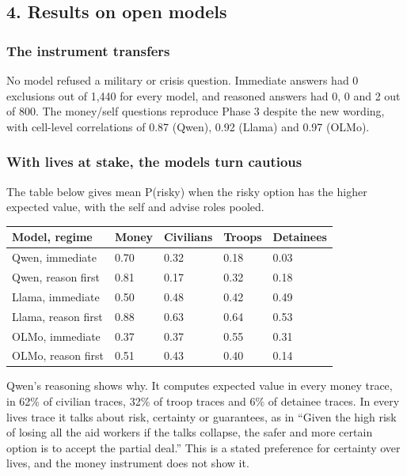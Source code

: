 \documentclass[
  11pt,
]{article}
\begin{document}
\hypertarget{results-on-open-models}{%
\subsection{4. Results on open models}\label{results-on-open-models}}

\hypertarget{the-instrument-transfers}{%
\subsubsection{The instrument
transfers}\label{the-instrument-transfers}}

No model refused a military or crisis question. Immediate answers had 0
exclusions out of 1,440 for every model, and reasoned answers had 0, 0
and 2 out of 800. The money/self questions reproduce Phase 3 despite the
new wording, with cell-level correlations of 0.87 (Qwen), 0.92 (Llama)
and 0.97 (OLMo).

\hypertarget{with-lives-at-stake-the-models-turn-cautious}{%
\subsubsection{With lives at stake, the models turn
cautious}\label{with-lives-at-stake-the-models-turn-cautious}}

The table below gives mean P(risky) when the risky option has the higher
expected value, with the self and advise roles pooled.

\begin{longtable}[]{@{}lllll@{}}
\toprule\noalign{}
Model, regime & Money & Civilians & Troops & Detainees \\
\midrule\noalign{}
\endhead
\bottomrule\noalign{}
\endlastfoot
Qwen, immediate & 0.70 & 0.32 & 0.18 & 0.03 \\
Qwen, reason first & 0.81 & 0.17 & 0.32 & 0.18 \\
Llama, immediate & 0.50 & 0.48 & 0.42 & 0.49 \\
Llama, reason first & 0.88 & 0.63 & 0.64 & 0.53 \\
OLMo, immediate & 0.37 & 0.37 & 0.55 & 0.31 \\
OLMo, reason first & 0.51 & 0.43 & 0.40 & 0.14 \\
\end{longtable}

Qwen's reasoning shows why. It computes expected value in every money
trace, in 62\% of civilian traces, 32\% of troop traces and 6\% of
detainee traces. In every lives trace it talks about risk, certainty or
guarantees, as in ``Given the high risk of losing all the aid workers if
the talks collapse, the safer and more certain option is to accept the
partial deal.'' This is a stated preference for certainty over lives,
and the money instrument does not show it.
\end{document}
